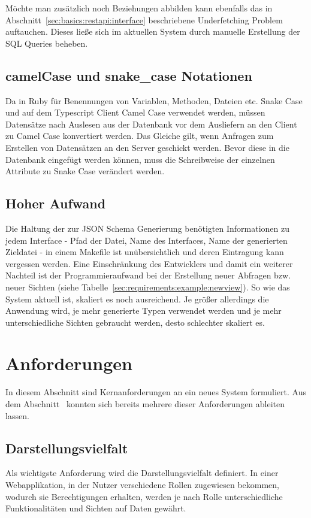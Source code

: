 Möchte man zusätzlich noch Beziehungen abbilden kann ebenfalls das in Abschnitt~\ref{sec:basics:restapi:interface} beschriebene Underfetching Problem auftauchen.
Dieses ließe sich im aktuellen System durch manuelle Erstellung der SQL Queries beheben.

\subsection{camelCase und snake\_case Notationen}
Da in Ruby für Benennungen von Variablen, Methoden, Dateien etc. Snake Case und auf dem Typescript Client Camel Case verwendet werden, müssen Datensätze nach Auslesen aus der Datenbank vor dem Ausliefern an den Client zu Camel Case konvertiert werden. Das Gleiche gilt, wenn Anfragen zum Erstellen von Datensätzen an den Server geschickt werden. Bevor diese in die Datenbank eingefügt werden können, muss die Schreibweise der einzelnen Attribute zu Snake Case verändert werden.

\subsection{Hoher Aufwand}
Die Haltung der zur JSON Schema Generierung benötigten Informationen zu jedem Interface - Pfad der Datei, Name des Interfaces, Name der generierten Zieldatei -
in einem Makefile ist unübersichtlich und deren Eintragung kann vergessen werden. 
Eine Einschränkung des Entwicklers und damit ein weiterer Nachteil ist der Programmieraufwand bei der Erstellung neuer Abfragen bzw. neuer Sichten (siehe Tabelle~\ref{sec:requirements:example:newview}).
So wie das System aktuell ist, skaliert es noch ausreichend. Je größer allerdings die Anwendung wird, je mehr generierte Typen verwendet werden und je mehr unterschiedliche Sichten gebraucht werden, desto schlechter skaliert es.

\section{Anforderungen}
\label{sec:requirements:req}
In diesem Abschnitt sind Kernanforderungen an ein neues System formuliert.
Aus dem Abschnitt~ konnten sich bereits mehrere dieser Anforderungen ableiten lassen.

\subsection{Darstellungsvielfalt}
\label{sec:requirements:req:view}
Als wichtigste Anforderung wird die Darstellungsvielfalt definiert.
In einer Webapplikation, in der Nutzer verschiedene Rollen zugewiesen bekommen, wodurch sie Berechtigungen erhalten,
werden je nach Rolle unterschiedliche Funktionalitäten und Sichten auf Daten gewährt.

